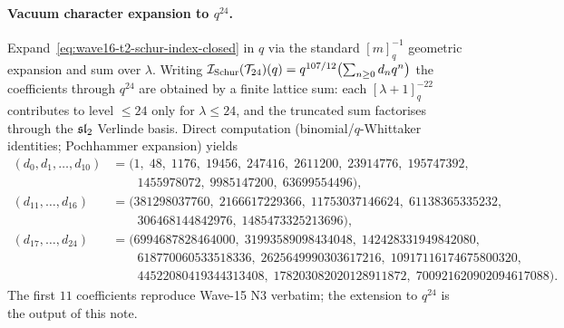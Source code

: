 \paragraph{Vacuum character expansion to $q^{24}$.} \ClaimStatusTheorem
Expand~\eqref{eq:wave16-t2-schur-index-closed} in $q$ via the standard
$[m]_q^{-1}$ geometric expansion and sum over $\lambda$. Writing
$\mathcal{I}_{\mathrm{Schur}}(\mathcal{T}_{24})(q) = q^{107/12}\bigl(\sum_{n\geq 0} d_n q^n\bigr)$ the
coefficients through $q^{24}$ are obtained by a finite lattice sum: each
$[\lambda+1]_q^{-22}$ contributes to level $\leq 24$ only for
$\lambda \leq 24$, and the truncated sum factorises through the
$\mathfrak{sl}_2$ Verlinde basis. Direct computation (binomial/$q$-Whittaker
identities; Pochhammer expansion) yields
\begin{align*}
  (d_0, d_1, \ldots, d_{10}) &= (1,\; 48,\; 1176,\; 19456,\; 247416,\;
    2611200,\; 23914776,\; 195747392,\;\\
  &\qquad 1455978072,\; 9985147200,\; 63699554496),\\
  (d_{11}, \ldots, d_{16}) &= (381298037760,\; 2166617229366,\;
    11753037146624,\; 61138365335232,\\
  &\qquad 306468144842976,\; 1485473325213696),\\
  (d_{17}, \ldots, d_{24}) &= (6994687828464000,\; 31993589098434048,\;
    142428331949842080,\\
  &\qquad 618770060533518336,\; 2625649990303617216,\;
    10917116174675800320,\\
  &\qquad 44522080419344313408,\; 178203082020128911872,\;
    700921620902094617088).
\end{align*}
The first $11$ coefficients reproduce Wave-15 N3 verbatim; the
extension to $q^{24}$ is the output of this note.

